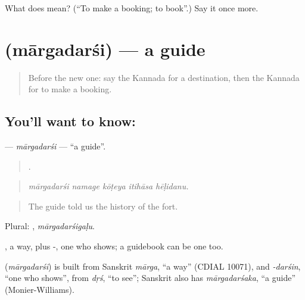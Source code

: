 \begin{tcolorbox}[breakable,colback=teal!4,colframe=teal!35!black,title={Before you move on}]
What does   mean? (\textquotedblleft{}To make a booking; to book\textquotedblright{}.) Say it once more.
\end{tcolorbox}
\section[\texorpdfstring{\kn{ಮಾರ್ಗದರ್ಶಿ} (mārgadarśi)}{ಮಾರ್ಗದರ್ಶಿ (mārgadarśi)}]{ (mārgadarśi) — a guide}

\label{lesson:KA-C455-margadarsi}



\begin{quote}
Before the new one: say the Kannada for a destination, then the Kannada for to make a booking.
\end{quote}

\subsection*{You'll want to know: }
\textbf{} — \emph{mārgadarśi} — \textquotedblleft{}a guide\textquotedblright{}.

\begin{quote}
    .
\end{quote}

\begin{quote}
\emph{mārgadarśi namage kōṭeya itihāsa hēḷidanu.}
\end{quote}

\begin{quote}
The guide told us the history of the fort.
\end{quote}

Plural: , \emph{mārgadarśigaḷu}.

, a way, plus -, one who shows; a guidebook can be one too.

\begin{cousinweb}
\textbf{} (\emph{mārgadarśi}) is built from Sanskrit \emph{mārga}, \textquotedblleft{}a way\textquotedblright{} (CDIAL 10071), and \emph{-darśin}, \textquotedblleft{}one who shows\textquotedblright{}, from \emph{dṛś}, \textquotedblleft{}to see\textquotedblright{}; Sanskrit also has \emph{mārgadarśaka}, \textquotedblleft{}a guide\textquotedblright{} (Monier-Williams).
\end{cousinweb}

